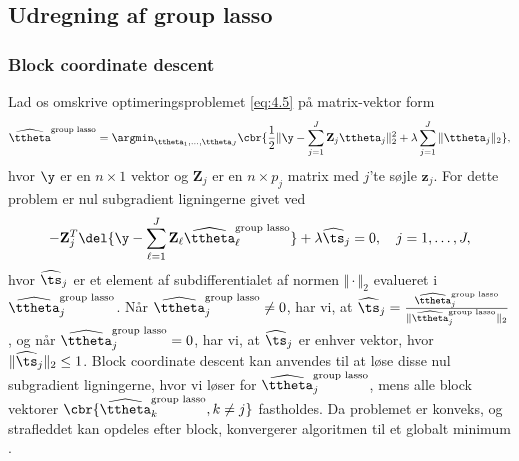 \subsection{Udregning af group lasso}
%
\subsubsection{Block coordinate descent}
Lad os omskrive optimeringsproblemet \eqref{eq:4.5} på matrix-vektor form
\begin{align}
\widehat{\ttheta}^{\text{group lasso}} = \argmin_{\ttheta_1, \ldots, \ttheta_J} \cbr{\frac{1}{2} \Vert \y - \sum_{j=1}^J \mathbf{Z}_{j} \ttheta_j \Vert_2^2 + \lambda \sum_{j=1}^J \Vert \ttheta_j \Vert_2}, \label{eq:4.11}
\end{align}
hvor \(\y\) er en \(n \times 1\) vektor og \(\mathbf{Z}_j\) er en \(n \times p_j\) matrix med \(j\)'te søjle \(\mathbf{z}_j\).
For dette problem er nul subgradient ligningerne givet ved
\begin{align*}
- \mathbf{Z}_{j}^T \del{\y - \sum_{\ell=1}^J \mathbf{Z}_\ell \widehat{\ttheta}^\text{group lasso}_\ell} + \lambda \widehat{\ts}_j = 0, \quad j=1,\ldots, J,
\end{align*} 
hvor $\widehat{\ts}_j $ er et element af subdifferentialet af normen $\Vert \cdot \Vert_2$ evalueret i $\widehat{\ttheta}_j^\text{group lasso}$.
Når $\widehat{\ttheta}^\text{group lasso}_j \neq 0$, har vi, at $\widehat{\ts}_j = \frac{\widehat{\ttheta}^\text{group lasso}_j}{\Vert \widehat{\ttheta}^\text{group lasso}_j \Vert_2}$, og når $\widehat{\ttheta}^\text{group lasso}_j=0$, har vi, at $\widehat{\ts}_j$ er enhver vektor, hvor $\Vert \widehat{\ts}_j \Vert_2 \leq 1$.
Block coordinate descent kan anvendes til at løse disse nul subgradient ligningerne, hvor vi løser for $\widehat{\ttheta}^\text{group lasso}_j$, mens alle block vektorer $\cbr{\widehat{\ttheta}^\text{group lasso}_k, k \neq j}$ fastholdes.
Da problemet er konveks, og strafleddet kan opdeles efter block, konvergerer algoritmen til et globalt minimum \citep{Tseng_1993}.


